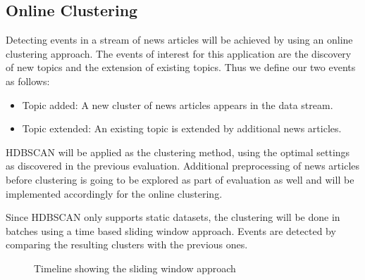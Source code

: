 \subsection{Online Clustering}

Detecting events in a stream of news articles will be achieved by using an online clustering approach. The events of interest for this application are the discovery of new topics and the extension of existing topics. Thus we define our two events as follows:

\begin{itemize}
    \item Topic added: A new cluster of news articles appears in the data stream.
    \item Topic extended: An existing topic is extended by additional news articles.
\end{itemize}

HDBSCAN will be applied as the clustering method, using the optimal settings as discovered in the previous evaluation. Additional preprocessing of news articles before clustering is going to be explored as part of evaluation as well and will be implemented accordingly for the online clustering.

Since HDBSCAN only supports static datasets, the clustering will be done in batches using a time based sliding window approach. Events are detected by comparing the resulting clusters with the previous ones.

\begin{figure}[h]
    \centering


    \caption{Timeline showing the sliding window approach}
    \label{fig:timeline}
\end{figure}

